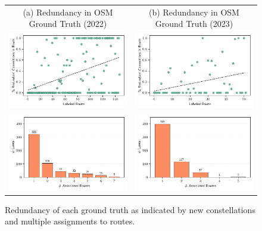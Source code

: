 \begin{figure}[htbp]
\centering 
\begin{tabular}{cc}
\footnotesize{(a) Redundancy in OSM Ground Truth (2022)} & \footnotesize{(b) Redundancy in OSM Ground Truth (2023)} \\
\includegraphics[width=0.45\linewidth]{images/matching-ground-truth-progression-osm-old.pdf} & \includegraphics[width=0.45\linewidth]{images/matching-ground-truth-progression-osm.pdf} \\
\includegraphics[width=0.45\linewidth]{images/matching-ground-truth-lsas-per-route-osm-old.pdf} & \includegraphics[width=0.45\linewidth]{images/matching-ground-truth-lsas-per-route-osm.pdf} \\
\end{tabular}
\caption{Redundancy of each ground truth as indicated by new constellations and multiple assignments to routes.}
\label{fig:ground-truth-routes-per-lanes-osm}
\end{figure}

